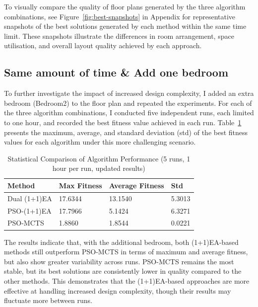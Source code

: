 \documentclass[]{article}
\begin{document}
To visually compare the quality of floor plans generated by the three algorithm combinations, see Figure~\ref{fig:best-snapshots} in Appendix for representative snapshots of the best solutions generated by each method within the same time limit. These snapshots illustrate the differences in room arrangement, space utilisation, and overall layout quality achieved by each approach.

\subsection{Same amount of time \& Add one bedroom}
To further investigate the impact of increased design complexity, I added an extra bedroom (Bedroom2) to the floor plan and repeated the experiments. For each of the three algorithm combinations, I conducted five independent runs, each limited to one hour, and recorded the best fitness value achieved in each run. Table~\ref{tab:statistical_comparison_new} presents the maximum, average, and standard deviation (std) of the best fitness values for each algorithm under this more challenging scenario.

\begin{table}[h]
    \centering
    \caption{Statistical Comparison of Algorithm Performance (5 runs, 1 hour per run, updated results)}
    \label{tab:statistical_comparison_new}
    \begin{tabularx}{\textwidth}{l | l | l | l}
        \hline
        \textbf{Method} & \textbf{Max Fitness} & \textbf{Average Fitness} & \textbf{Std} \\
        \hline
        Dual (1+1)EA    & 17.6344              & 13.1540                  & 5.3013       \\
        PSO-(1+1)EA     & 17.7966              & 5.1424                   & 6.3271       \\
        PSO-MCTS        & 1.8860               & 1.8544                   & 0.0221       \\
        \hline
    \end{tabularx}
\end{table}

The results indicate that, with the additional bedroom, both (1+1)EA-based methods still outperform PSO-MCTS in terms of maximum and average fitness, but also show greater variability across runs. PSO-MCTS remains the most stable, but its best solutions are consistently lower in quality compared to the other methods. This demonstrates that the (1+1)EA-based approaches are more effective at handling increased design complexity, though their results may fluctuate more between runs.
\end{document}
